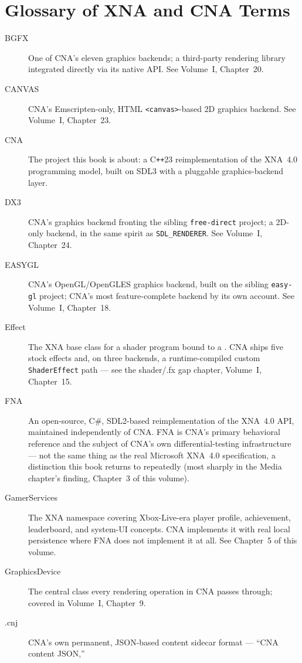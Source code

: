 \chapter{Glossary of XNA and CNA Terms}
\label{ch:glossary}

\begin{description}
\item[BGFX] One of CNA's eleven graphics backends; a third-party rendering library integrated
  directly via its native API. See Volume~I, Chapter~20.
\item[CANVAS] CNA's Emscripten-only, HTML \texttt{<canvas>}-based 2D graphics backend. See
  Volume~I, Chapter~23.
\item[CNA] The project this book is about: a C\texttt{++}23 reimplementation of the XNA~4.0
  programming model, built on SDL3 with a pluggable graphics-backend layer.
\item[DX3] CNA's graphics backend fronting the sibling \texttt{free-direct} project; a 2D-only
  backend, in the same spirit as \texttt{SDL\_RENDERER}. See Volume~I, Chapter~24.
\item[EASYGL] CNA's OpenGL/OpenGLES graphics backend, built on the sibling \texttt{easy-gl}
  project; CNA's most feature-complete backend by its own account. See Volume~I, Chapter~18.
\item[Effect] The XNA base class for a shader program bound to a .
  CNA ships five stock effects and, on three backends, a runtime-compiled custom
  \texttt{ShaderEffect} path --- see the shader/.fx gap chapter, Volume~I, Chapter~15.
\item[FNA] An open-source, C\#, SDL2-based reimplementation of the XNA~4.0 API, maintained
  independently of CNA. FNA is CNA's primary behavioral reference and the subject of CNA's
  own differential-testing infrastructure --- not the same thing as the real Microsoft
  XNA~4.0 specification, a distinction this book returns to repeatedly (most sharply in the
  Media chapter's  finding, Chapter~3 of this volume).
\item[GamerServices] The XNA namespace covering Xbox-Live-era player profile, achievement,
  leaderboard, and system-UI concepts. CNA implements it with real local persistence where
  FNA does not implement it at all. See Chapter~5 of this volume.
\item[GraphicsDevice] The central class every rendering operation in CNA passes through;
  covered in Volume~I, Chapter~9.
\item[.cnj] CNA's own permanent, JSON-based content sidecar format --- ``CNA content JSON,''

\end{description}
